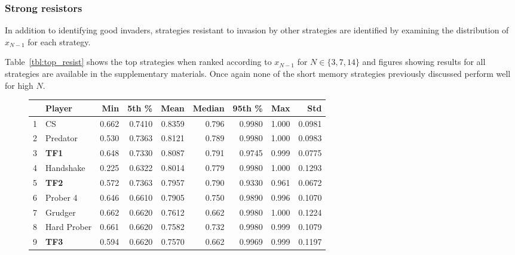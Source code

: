 \documentclass[10pt,letterpaper]{article}
\begin{document}
\subsubsection*{Strong resistors}

In addition to identifying good invaders, strategies resistant to invasion by
other strategies are identified by examining the distribution of $x_{N-1}$ for
each strategy.

Table~\ref{tbl:top_resist} shows the top strategies when ranked
according to \(x_{N-1}\) for \(N\in\{3, 7, 14\}\) and figures showing results
for all strategies are available in the supplementary materials.
Once again none of the short memory strategies previously discussed perform well for high \(N\).

\begin{table}[!hbtp]
    \tiny
    \centering
    \begin{subfigure}[t]{\columnwidth}
        \centering
            \begin{tabular}{llrrrrrrr}
            \toprule
            {} &                Player &    Min &   5th \% &    Mean &  Median &  95th \% &    Max &     Std \\
            \midrule
            1  &                    CS &  0.662 &  0.7410 &  0.8359 &   0.796 &  0.9980 &  1.000 &  0.0981 \\
            2  &              Predator &  0.530 &  0.7363 &  0.8121 &   0.789 &  0.9980 &  1.000 &  0.0983 \\
            3  &                   \textbf{TF1} &  0.648 &  0.7330 &  0.8087 &   0.791 &  0.9745 &  0.999 &  0.0775 \\
            4  &             Handshake &  0.225 &  0.6322 &  0.8014 &   0.779 &  0.9980 &  1.000 &  0.1293 \\
            5  &                   \textbf{TF2} &  0.572 &  0.7363 &  0.7957 &   0.790 &  0.9330 &  0.961 &  0.0672 \\
            6  &              Prober 4 &  0.646 &  0.6610 &  0.7905 &   0.750 &  0.9890 &  0.996 &  0.1070 \\
            7  &               Grudger &  0.662 &  0.6620 &  0.7612 &   0.662 &  0.9980 &  1.000 &  0.1224 \\
            8  &           Hard Prober &  0.661 &  0.6620 &  0.7582 &   0.732 &  0.9980 &  0.999 &  0.1079 \\
            9  &                   \textbf{TF3} &  0.594 &  0.6620 &  0.7570 &   0.662 &  0.9969 &  0.999 &  0.1197 \\

\end{tabular}
\end{subfigure}
\end{table}
\end{document}
